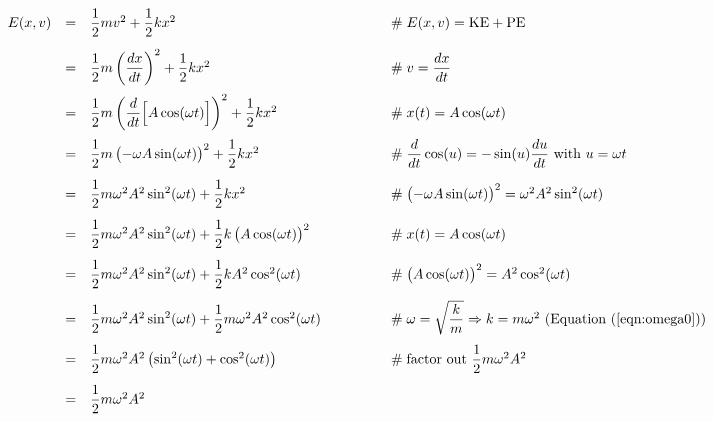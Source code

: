 \documentclass{article}
\theoremstyle{definition}
\begin{document}
\begin{equation*}
\begin{array}{llll}
E(x,v)
&=& \dfrac{1}{2}mv^2 + \dfrac{1}{2}kx^2 									
						&\hspace{4em} \mathrel{\#} E(x,v) = \text{KE} + \text{PE} \\
[12pt]
&=& \dfrac{1}{2} m \left (\dfrac{dx}{dt} \right )^2 + \dfrac{1}{2}kx^2 		
						&\hspace{4em} \mathrel{\#} v = \dfrac{dx}{dt} \\
[12pt]
&=& \dfrac{1}{2} m \left (\dfrac{d}{dt} \Big [A \cos (\omega t) \Big ] \right )^2 + \dfrac{1}{2}kx^2 
						&\hspace{4em} \mathrel{\#} x(t) = A \cos (\omega t) \\
[12pt]
&=& \dfrac{1}{2} m \left (- \omega A \sin (\omega t) \right )^2 + \dfrac{1}{2}kx^2 
						&\hspace{4em} \mathrel{\#} \text{$\dfrac{d}{dt}\cos (u)
                                                = -\sin (u) \dfrac{du}{dt}$ with $u = \omega t$}  \\
[12pt]
&=& \dfrac{1}{2} m \omega^2 A^2 \sin^2 (\omega t) + \dfrac{1}{2}kx^2 
						&\hspace{4em} \mathrel{\#} \left (- \omega A \sin (\omega t) \right )^2 = 
						                           \omega^2 A^2 \sin^2 (\omega t) \\
[12pt]
&=& \dfrac{1}{2} m \omega^2 A^2 \sin^2 (\omega t) + \dfrac{1}{2}k\left (A \cos (\omega t) \right )^2 
						&\hspace{4em} \mathrel{\#} x(t) = A \cos (\omega t)\\
[12pt]
&=& \dfrac{1}{2} m \omega^2 A^2 \sin^2 (\omega t) + \dfrac{1}{2}k A^2 \cos^2 (\omega t) 
						&\hspace{4em} \mathrel{\#} \left ( A \cos (\omega t) \right )^2 = A^2 \cos^2 (\omega t) \\
[12pt]
&=& \dfrac{1}{2} m \omega^2 A^2 \sin^2 (\omega t) + \dfrac{1}{2} m \omega^2 A^2 \cos^2 (\omega t) 
						&\hspace{4em} \mathrel{\#} \omega = \sqrt{\dfrac{k}{m}} \Rightarrow k = m 
						                           \omega^2 \text{ (Equation (\ref{eqn:omega0}))} \\
[12pt]
&=& \dfrac{1}{2} m \omega^2 A^2 \left (\sin^2 (\omega t) + \cos^2 (\omega t) \right )
						&\hspace{4em} \mathrel{\#} \text{factor out $\dfrac{1}{2} m 
						                           \omega^2 A^2$} \\
[12pt]
&=& \dfrac{1}{2} m \omega^2 A^2

\end{array}
\end{equation*}
\end{document}
